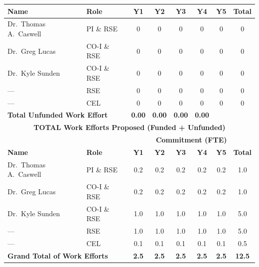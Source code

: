 \documentclass[12pt]{article}
\numberwithin{page}{section}
\begin{document}
\begin{tabular}{|l|l|c|c|c|c|c|c|}
  \cellcolor{gray!30}\textbf{Name }& \cellcolor{gray!30}\textbf{Role} & \cellcolor{gray!30}\textbf{Y1} & \cellcolor{gray!30}\textbf{Y2} & \cellcolor{gray!30}\textbf{Y3}& \cellcolor{gray!30}\textbf{Y4}& \cellcolor{gray!30}\textbf{Y5} & \cellcolor{gray!30}\textbf{Total}     \\  \hline
  Dr.\ Thomas A.\ Caswell & PI \& RSE   & 0 & 0 & 0 & 0 & 0 & 0 \\  \hline
  Dr.\ Greg Lucas         & CO-I \& RSE & 0 & 0 & 0 & 0 & 0 & 0 \\  \hline
  Dr.\ Kyle Sunden        & CO-I \& RSE & 0 & 0 & 0 & 0 & 0 & 0 \\  \hline
  ---                     & RSE         & 0 & 0 & 0 & 0 & 0 & 0 \\  \hline
  ---                     & CEL         & 0 & 0 & 0 & 0 & 0 & 0 \\  \hline
  \multicolumn{2}{|l|}{\textbf{Total Unfunded Work Effort}} & \textbf{0.00} & \textbf{0.00} & \textbf{0.00}& \textbf{0.00}\\\hline
  \multicolumn{8}{|c|}{\cellcolor{gray!30}\textbf{TOTAL Work Efforts Proposed (Funded + Unfunded)}}\\  \hline
  \cellcolor{gray!30} &  \cellcolor{gray!30}&\multicolumn{6}{c|}{\cellcolor{gray!30}\textbf{Commitment (FTE)}} \\
  \hhline{|*2{>{\arrayrulecolor{gray!30}}-}*4{>{\arrayrulecolor{black}}-}|}
  \cellcolor{gray!30}\textbf{Name }& \cellcolor{gray!30}\textbf{Role} & \cellcolor{gray!30}\textbf{Y1} & \cellcolor{gray!30}\textbf{Y2} & \cellcolor{gray!30}\textbf{Y3}& \cellcolor{gray!30}\textbf{Y4}& \cellcolor{gray!30}\textbf{Y5} & \cellcolor{gray!30}\textbf{Total}     \\  \hline
  Dr.\ Thomas A.\ Caswell & PI \& RSE   & 0.2 & 0.2 & 0.2 & 0.2 & 0.2 & 1.0 \\  \hline
  Dr.\ Greg Lucas         & CO-I \& RSE & 0.2 & 0.2 & 0.2 & 0.2 & 0.2 & 1.0 \\  \hline
  Dr.\ Kyle Sunden        & CO-I \& RSE & 1.0 & 1.0 & 1.0 & 1.0 & 1.0 & 5.0 \\  \hline
  ---                     & RSE         & 1.0 & 1.0 & 1.0 & 1.0 & 1.0 & 5.0 \\  \hline
  ---                     & CEL         & 0.1 & 0.1 & 0.1 & 0.1 & 0.1 & 0.5 \\  \hline
  \multicolumn{2}{|l|}{\textbf{Grand Total of Work Efforts}} & \textbf{2.5}& \textbf{2.5}& \textbf{2.5}& \textbf{2.5}& \textbf{2.5} &  \textbf{12.5}\\    \hline
\end{tabular}
\end{document}
